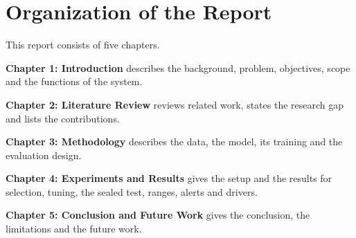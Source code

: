 \section{Organization of the Report}
This report consists of five chapters.

\textbf{Chapter 1: Introduction} describes the background, problem, objectives, scope and the functions of the system.

\textbf{Chapter 2: Literature Review} reviews related work, states the research gap and lists the contributions.

\textbf{Chapter 3: Methodology} describes the data, the model, its training and the evaluation design.

\textbf{Chapter 4: Experiments and Results} gives the setup and the results for selection, tuning, the sealed test, ranges, alerts and drivers.

\textbf{Chapter 5: Conclusion and Future Work} gives the conclusion, the limitations and the future work.
